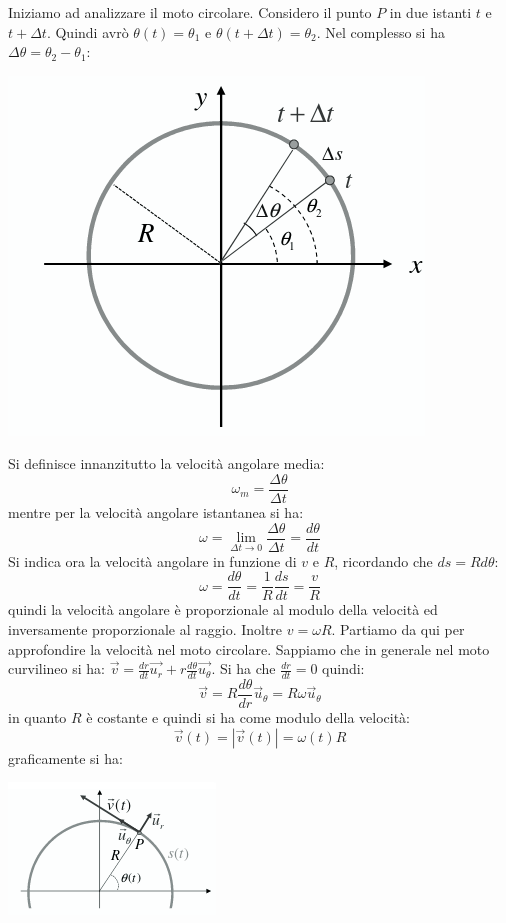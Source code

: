 \documentclass[a4paper,12pt, oneside]{book}
\begin{document}
Iniziamo ad analizzare il moto circolare. Considero il punto $P$ in due istanti $t$ e $t+\Delta t$. Quindi avrò $\theta (t)=\theta_1$ e $\theta(t+\Delta t)=\theta_2$. Nel complesso si ha $\Delta \theta= \theta_2-\theta_1$:
\begin{center}
	\includegraphics[scale=0.52]{img/cir2.png}
\end{center}
Si definisce innanzitutto la velocità angolare media:
$$\omega_m=\frac{\Delta\theta}{\Delta t}$$
mentre per la velocità angolare istantanea si ha:
$$\omega=\lim_{\Delta t\to 0}\frac{\Delta\theta}{\Delta t}=\frac{d\theta}{dt}$$
Si indica ora la velocità angolare in funzione di $v$ e $R$, ricordando che $ds=Rd\theta$:
$$\omega=\frac{d\theta}{dt}=\frac{1}{R}\frac{ds}{dt}=\frac{v}{R}$$
quindi la velocità angolare è proporzionale al modulo della velocità ed inversamente proporzionale al raggio. Inoltre $v=\omega R$. Partiamo da qui per approfondire la velocità nel moto circolare. Sappiamo che in generale nel moto curvilineo si ha: $\vec{v}=\frac{dr}{dt}\vec{u_r}+r\frac{d\theta}{dt}\vec{u_\theta}$. Si ha che $\frac{dr}{dt}=0$ quindi:
$$\vec{v}=R\frac{d\theta}{dr}\vec{u}_\theta=R\omega\vec{u}_\theta$$
\newpage
in quanto $R$ è costante e quindi si ha come modulo della velocità:
$$\vec{v}(t)=|\vec{v}(t)|=\omega(t)R$$
graficamente si ha:
\begin{center}
	\includegraphics[scale=0.9]{img/cir3.png}
\end{center}
\end{document}
